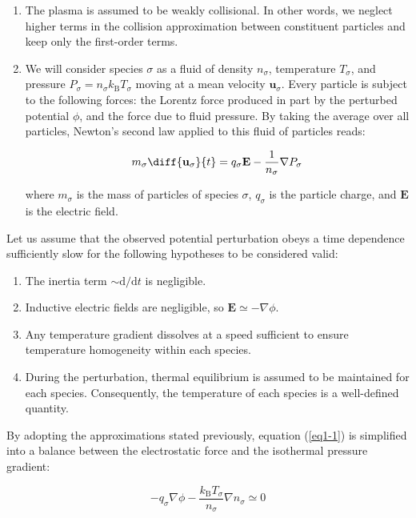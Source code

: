 \begin{enumerate}
    \item The plasma is assumed to be weakly collisional. In other words, we neglect higher terms in the collision approximation between constituent particles and keep only the first-order terms.
    \item We will consider species $\sigma$ as a fluid of density $n_\sigma$, temperature $T_\sigma$, and pressure $P_\sigma=n_\sigma k_\mathrm{B}T_\sigma$ moving at a mean velocity $\mathbf{u}_\sigma$. Every particle is subject to the following forces: the Lorentz force produced in part by the perturbed potential $\phi$, and the force due to fluid pressure. By taking the average over all particles, Newton's second law applied to this fluid of particles reads:
    
    \begin{equation}
        \label{eq1-1}
        m_\sigma\diff{\mathbf{u}_\sigma}{t}=q_\sigma\mathbf{E}-\frac{1}{n_\sigma}\nabla P_\sigma
    \end{equation}
    
    where $m_\sigma$ is the mass of particles of species $\sigma$, $q_\sigma$ is the particle charge, and $\mathbf{E}$ is the electric field.
\end{enumerate}

Let us assume that the observed potential perturbation obeys a time dependence sufficiently slow for the following hypotheses to be considered valid:

\begin{enumerate}
    \item The inertia term $\sim\mathrm{d}/\mathrm{d}t$ is negligible.
    \item Inductive electric fields are negligible, so $\mathbf{E}\simeq-\nabla\phi$.
    \item Any temperature gradient dissolves at a speed sufficient to ensure temperature homogeneity within each species.
    \item During the perturbation, thermal equilibrium is assumed to be maintained for each species. Consequently, the temperature of each species is a well-defined quantity.
\end{enumerate}

By adopting the approximations stated previously, equation (\ref{eq1-1}) is simplified into a balance between the electrostatic force and the isothermal pressure gradient:

\begin{equation}
    \label{eq1-2}
    -q_\sigma\nabla\phi-\frac{k_\mathrm{B}T_\sigma}{n_\sigma}\nabla n_\sigma\simeq0
\end{equation}

